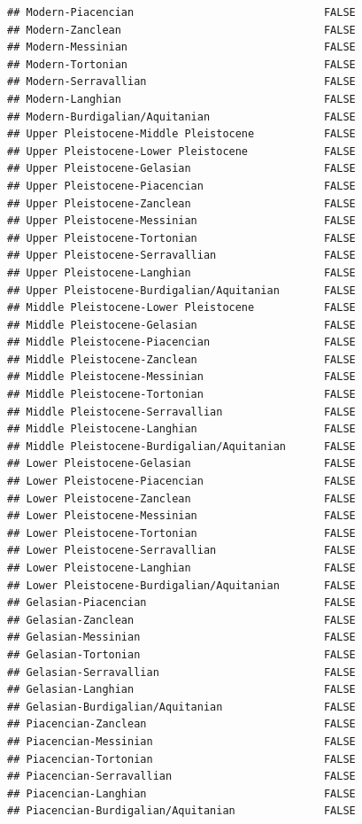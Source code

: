 \documentclass[]{article}
\begin{document}
\begin{verbatim}
## Modern-Piacencian                              FALSE
## Modern-Zanclean                                FALSE
## Modern-Messinian                               FALSE
## Modern-Tortonian                               FALSE
## Modern-Serravallian                            FALSE
## Modern-Langhian                                FALSE
## Modern-Burdigalian/Aquitanian                  FALSE
## Upper Pleistocene-Middle Pleistocene           FALSE
## Upper Pleistocene-Lower Pleistocene            FALSE
## Upper Pleistocene-Gelasian                     FALSE
## Upper Pleistocene-Piacencian                   FALSE
## Upper Pleistocene-Zanclean                     FALSE
## Upper Pleistocene-Messinian                    FALSE
## Upper Pleistocene-Tortonian                    FALSE
## Upper Pleistocene-Serravallian                 FALSE
## Upper Pleistocene-Langhian                     FALSE
## Upper Pleistocene-Burdigalian/Aquitanian       FALSE
## Middle Pleistocene-Lower Pleistocene           FALSE
## Middle Pleistocene-Gelasian                    FALSE
## Middle Pleistocene-Piacencian                  FALSE
## Middle Pleistocene-Zanclean                    FALSE
## Middle Pleistocene-Messinian                   FALSE
## Middle Pleistocene-Tortonian                   FALSE
## Middle Pleistocene-Serravallian                FALSE
## Middle Pleistocene-Langhian                    FALSE
## Middle Pleistocene-Burdigalian/Aquitanian      FALSE
## Lower Pleistocene-Gelasian                     FALSE
## Lower Pleistocene-Piacencian                   FALSE
## Lower Pleistocene-Zanclean                     FALSE
## Lower Pleistocene-Messinian                    FALSE
## Lower Pleistocene-Tortonian                    FALSE
## Lower Pleistocene-Serravallian                 FALSE
## Lower Pleistocene-Langhian                     FALSE
## Lower Pleistocene-Burdigalian/Aquitanian       FALSE
## Gelasian-Piacencian                            FALSE
## Gelasian-Zanclean                              FALSE
## Gelasian-Messinian                             FALSE
## Gelasian-Tortonian                             FALSE
## Gelasian-Serravallian                          FALSE
## Gelasian-Langhian                              FALSE
## Gelasian-Burdigalian/Aquitanian                FALSE
## Piacencian-Zanclean                            FALSE
## Piacencian-Messinian                           FALSE
## Piacencian-Tortonian                           FALSE
## Piacencian-Serravallian                        FALSE
## Piacencian-Langhian                            FALSE
## Piacencian-Burdigalian/Aquitanian              FALSE

\end{verbatim}
\end{document}
